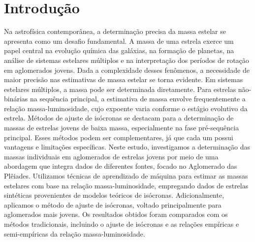 
\section{\textbf{Introdução}}
  Na astrofísica contemporânea, a determinação precisa da massa estelar se apresenta como um desafio fundamental. A massa de uma estrela exerce um papel central na evolução química das galáxias, na formação de planetas, na análise de sistemas estelares múltiplos e na interpretação dos períodos de rotação em aglomerados jovens. Dada a complexidade desses fenômenos, a necessidade de maior precisão nas estimativas de massa estelar se torna evidente.
  Em sistemas estelares múltiplos, a massa pode ser determinada diretamente. Para estrelas não-binárias na sequência principal, a estimativa de massa envolve frequentemente a relação massa-luminosidade, cujo expoente varia conforme o estágio evolutivo da estrela. Métodos de ajuste de isócronas se destacam para a determinação de massas de estrelas jovens de baixa massa, especialmente na fase pré-sequência principal. Esses métodos podem ser complementares, já que cada um possui vantagens e limitações específicas.
  Neste estudo, investigamos a determinação das massas individuais em aglomerados de estrelas jovens por meio de uma abordagem que integra dados de diferentes fontes, focado no Aglomerado das Plêiades. Utilizamos técnicas de aprendizado de máquina para estimar as massas estelares com base na relação massa-luminosidade, empregando dados de estrelas sintéticas provenientes de modelos teóricos de isócronas. Adicionalmente, aplicamos o método de ajuste de isócronas, voltado principalmente para aglomerados mais jovens.
  Os resultados obtidos foram comparados com os métodos tradicionais, incluindo o ajuste de isócronas e as relações empíricas e semi-empíricas da relação massa-luminosidade.